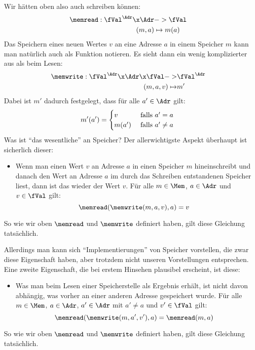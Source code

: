 %
Wir hätten oben also auch schreiben können:
%
\begin{align*}
  \memread : \fVal^{\Adr} \x \Adr &-> \fVal \\
             (m,a) &\mapsto m(a) \\
\end{align*}
%
Das Speichern eines neuen Wertes $v$ an eine Adresse $a$ in einem
Speicher $m$ kann man natürlich auch als Funktion notieren. Es sieht
dann ein wenig komplizierter aus als beim Lesen:
%
\begin{align*}
  \memwrite : \fVal^{\Adr} \x \Adr \x \fVal ->& \fVal^{\Adr} \\
             (m,a, v) \mapsto& m' 
\end{align*}
%
Dabei ist $m'$ dadurch festgelegt, dass  für alle $a'\in\Adr$ gilt:
\begin{equation*}
  m'(a') =
  \begin{cases}
    v & \text{ falls } a'=a \\
    m(a') & \text{ falls } a'\not=a \\
  \end{cases}\\
\end{equation*}
%
Was ist "`das wesentliche"' an Speicher? Der allerwichtigste Aspekt
überhaupt ist sicherlich dieser:
\begin{itemize}
\item Wenn man einen Wert $v$ an Adresse $a$ in einen Speicher $m$
  hineinschreibt und danach den Wert an Adresse $a$ im durch das
  Schreiben entstandenen Speicher liest, dann ist das wieder der Wert
  $v$. Für alle $m\in\Mem$, $a\in\Adr$ und $v\in\fVal$ gilt:
  \begin{equation}
  \memread(\memwrite(m,a,v),a) = v    \label{eq:mem-read-write}
\end{equation}
\end{itemize}
%
So wie wir oben $\memread$ und $\memwrite$ definiert haben, gilt diese
Gleichung tatsächlich.

Allerdings man kann sich "`Implementierungen"' von Speicher
vorstellen, die zwar diese Eigenschaft haben, aber trotzdem nicht
unseren Vorstellungen entsprechen. Eine zweite Eigenschaft, die bei
erstem Hinsehen plausibel erscheint, ist diese:
%
\begin{itemize}
\item Was man beim Lesen einer Speicherstelle als Ergebnis erhält, ist
  nicht davon abhängig, was vorher an einer anderen Adresse
  gespeichert wurde. Für alle $m\in\Mem$, $a\in\Adr$, $a'\in\Adr$ mit
  $a'\not= a$ und $v'\in \fVal$ gilt:
  \begin{equation}
    \memread(\memwrite(m,a',v'),a) = \memread(m,a)  \label{eq:mem-read-write-read}
  \end{equation}
\end{itemize}
%
So wie wir oben $\memread$ und $\memwrite$ definiert haben, gilt diese
Gleichung tatsächlich.


